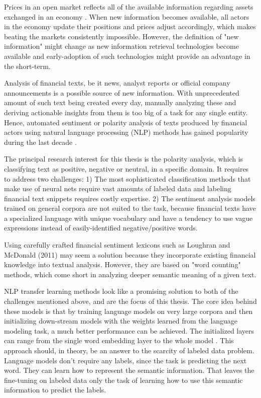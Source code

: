 \documentclass[../main.tex]{subfiles}
\begin{document}
Prices in an open market reflects all of the available information regarding assets exchanged in an economy \cite{Malkiel2003}. When new information becomes available, all actors in the economy update their positions and prices adjust accordingly, which makes beating the markets consistently impossible. However, the definition of "new information" might change as new information retrieval technologies become available and early-adoption of such technologies might provide an advantage in the short-term. 

Analysis of financial texts, be it news, analyst reports or official company announcements is a possible source of new information. With unprecedented amount of such text being created every day, manually analyzing these and deriving actionable insights from them is too big of a task for any single entity. Hence, automated sentiment or polarity analysis of texts produced by financial actors using natural language processing (NLP) methods has gained popularity during the last decade \cite{Guo2016}.

The principal research interest for this thesis is the polarity analysis, which is classifying text as positive, negative or neutral, in a specific domain. It requires to address two challenges: 1) The most sophisticated classification methods that make use of neural nets require vast amounts of labeled data and labeling financial text snippets requires costly expertise. 2) The sentiment analysis models trained on general corpora are not suited to the task, because financial texts have a specialized language with unique vocabulary and have a tendency to use vague expressions instead of easily-identified negative/positive words. 

Using carefully crafted financial sentiment lexicons such as Loughran and McDonald (2011) \cite{Loughran2011} may seem a solution because they incorporate existing financial knowledge into textual analysis. However, they are based on "word counting" methods, which come short in analyzing deeper semantic meaning of a given text.

NLP transfer learning methods look like a promising solution to both of the challenges mentioned above, and are the focus of this thesis. The core idea behind these models is that by training language models on very large corpora and then initializing down-stream models with the weights learned from the language modeling task, a much better performance can be achieved. The initialized layers can range from the single word embedding layer \cite{Peters2018} to the whole model \cite{Howard2018}. This approach should, in theory, be an answer to the scarcity of labeled data problem. Language models don't require any labels, since the task is predicting the next word. They can learn how to represent the semantic information. That leaves the fine-tuning on labeled data only the task of learning how to use this semantic information to predict the labels.
\end{document}
